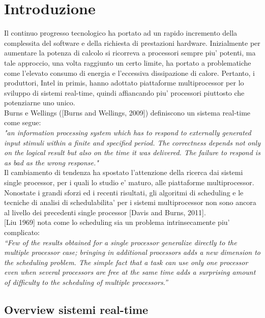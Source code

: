 \section{Introduzione}
\label{sec:introduzione}

Il continuo progresso tecnologico ha portato ad un rapido incremento della complessita del software e della richiesta di prestazioni hardware. Inizialmente per aumentare la potenza di calcolo si ricorreva a processori sempre piu' potenti, ma tale approccio, una volta raggiunto un certo limite, ha portato a problematiche come l'elevato consumo di energia e l'eccessiva dissipazione di calore. Pertanto, i produttori, Intel in primis, hanno adottato piattaforme multiprocessor per lo sviluppo di sistemi real-time, quindi affiancando piu' processori piuttosto che potenziarne uno unico.\\

Burns e Wellings ([Burns and Wellings, 2009]) definiscono un sistema real-time come segue:\\

\textit{"an information processing system which has to respond to externally generated input stimuli within a finite and specified period. The correctness depends not only on the logical result but also on the time it was delivered. The failure to respond is as bad as the wrong response."}\\

Il cambiamento di tendenza ha spostato l'attenzione della ricerca dai sistemi single processor, per i quali lo studio e' maturo, alle piattaforme multiprocessor. Nonostate i grandi sforzi ed i recenti risultati, gli algoritmi di scheduling e le tecniche di analisi di schedulabilita' per i sistemi multiprocessor non sono ancora al livello dei precedenti single processor [Davis and Burns, 2011].\\

[Liu 1969] nota come lo scheduling sia un problema intrinsecamente piu' complicato:\\

\textit{“Few of the results obtained for a single processor generalize directly to the multiple processor case; bringing in additional processors adds a new dimension to the scheduling problem. The simple fact that a task can use only one processor even when several processors are free at the same time adds a surprising amount of difficulty to the scheduling of multiple processors.”}\\

\subsection{Overview sistemi real-time}
\label{sec:overviewRTS}

